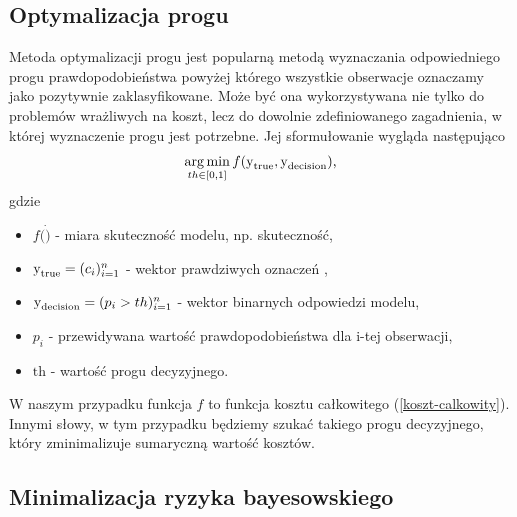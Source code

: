 \documentclass[inzynierska]{pwr_wmat_praca_dyplomowa}
\theoremstyle{plain}
\numberwithin{theorem}{chapter}
\theoremstyle{definition}
\numberwithin{theorem}{chapter}
\DeclareMathOperator*{\argmin}{arg\,min}
\begin{document}
\subsection{Optymalizacja progu}
Metoda optymalizacji progu jest popularną metodą wyznaczania odpowiedniego progu prawdopodobieństwa powyżej którego wszystkie obserwacje oznaczamy jako pozytywnie zaklasyfikowane. Może być ona wykorzystywana nie tylko do problemów wrażliwych na koszt, lecz do dowolnie zdefiniowanego zagadnienia, w której wyznaczenie progu jest potrzebne. Jej sformułowanie wygląda następująco
$$ \argmin_{th \in [0,1]} f(\ylab{y}{true}, \ylab{y}{decision}) \text{,} $$
gdzie 
\begin{itemize}
	\item $ f(\dot) $ - miara skuteczność modelu, np. skuteczność,
	\item $ \text{y}_{\text{true}} = (c_i)_{i=1}^n $ - wektor prawdziwych oznaczeń ,
	\item $ \text{y}_{\text{decision}} = (p_i > th)_{i=1}^n $ - wektor binarnych odpowiedzi modelu,
	\item $ p_i $ - przewidywana wartość prawdopodobieństwa dla i-tej obserwacji,
	\item $ \text{th} $ - wartość progu decyzyjnego.
\end{itemize}{}
W naszym przypadku funkcja $f$ to funkcja kosztu całkowitego (\ref{koszt-calkowity}). Innymi słowy, w tym przypadku będziemy szukać takiego progu decyzyjnego, który zminimalizuje sumaryczną wartość kosztów.

\subsection{Minimalizacja ryzyka bayesowskiego}
\end{document}
